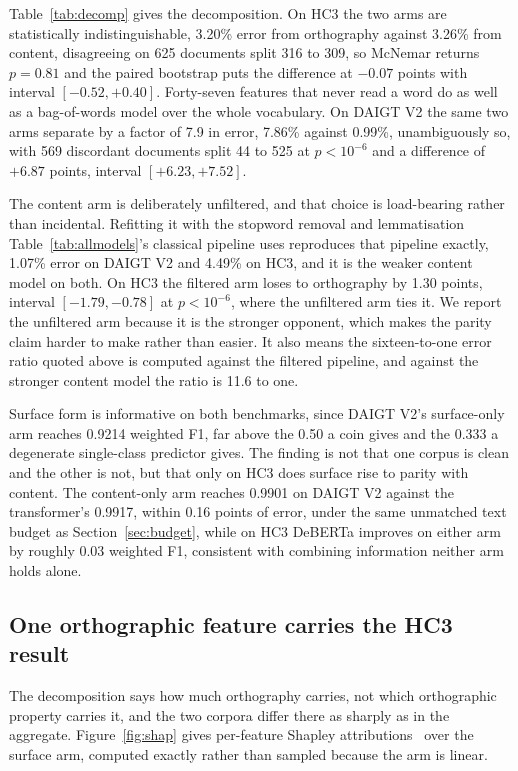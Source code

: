 Table~\ref{tab:decomp} gives the decomposition. On HC3 the two arms are statistically indistinguishable, 3.20\% error from orthography against 3.26\% from content, disagreeing on 625 documents split 316 to 309, so McNemar returns $p=0.81$ and the paired bootstrap puts the difference at $-0.07$ points with interval $[-0.52, +0.40]$. Forty-seven features that never read a word do as well as a bag-of-words model over the whole vocabulary. On DAIGT V2 the same two arms separate by a factor of 7.9 in error, 7.86\% against 0.99\%, unambiguously so, with 569 discordant documents split 44 to 525 at $p < 10^{-6}$ and a difference of $+6.87$ points, interval $[+6.23, +7.52]$.

The content arm is deliberately unfiltered, and that choice is load-bearing rather than incidental. Refitting it with the stopword removal and lemmatisation Table~\ref{tab:allmodels}'s classical pipeline uses reproduces that pipeline exactly, 1.07\% error on DAIGT V2 and 4.49\% on HC3, and it is the weaker content model on both. On HC3 the filtered arm loses to orthography by 1.30 points, interval $[-1.79, -0.78]$ at $p < 10^{-6}$, where the unfiltered arm ties it. We report the unfiltered arm because it is the stronger opponent, which makes the parity claim harder to make rather than easier. It also means the sixteen-to-one error ratio quoted above is computed against the filtered pipeline, and against the stronger content model the ratio is 11.6 to one.

Surface form is informative on both benchmarks, since DAIGT V2's surface-only arm reaches 0.9214 weighted F1, far above the 0.50 a coin gives and the 0.333 a degenerate single-class predictor gives. The finding is not that one corpus is clean and the other is not, but that only on HC3 does surface rise to parity with content. The content-only arm reaches 0.9901 on DAIGT V2 against the transformer's 0.9917, within 0.16 points of error, under the same unmatched text budget as Section~\ref{sec:budget}, while on HC3 DeBERTa improves on either arm by roughly 0.03 weighted F1, consistent with combining information neither arm holds alone.

\subsection{One orthographic feature carries the HC3 result}
\label{sec:shap}

The decomposition says how much orthography carries, not which orthographic property carries it, and the two corpora differ there as sharply as in the aggregate. Figure~\ref{fig:shap} gives per-feature Shapley attributions~\cite{Lundberg2017unified} over the surface arm, computed exactly rather than sampled because the arm is linear.

